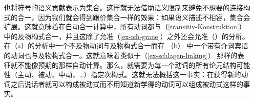 \citet{KF99a} 也将符号的语义贡献表示为集合。这样就无法借助语义限制来避免不想要的连接构式的合一，因为我们就会得到跟价集合一样的效果：如果语义描述不相容，集合会扩展。这就意味着在自动合一计算中，所有动词都与（\ref{transitiv-Konstruktion}）中的及物构式合一，并且这除了允准（\ref{ex-ich-graue}）之外还会允准（）的分析。
\eal
{}
\zl
在（a）的分析中一个不及物动词与及物构式合一而在 （b） 中一个带有介词宾语的动词也与及物构式合一。这就意味着类似于（\ref{ex-schlagen-linking}） 那样的表征就不能像\citet{Kay2002a}预期的那样自动计算。那么，就需要为每一个动词的所有论元结构可能性（主动、被动、中动，\ldots）指定次构式。这就无法概括这一事实：在获得新的动词之后说话者就可以构成被动式而不用知道新学得的动词可以组成被动式这样的事实。%
%

